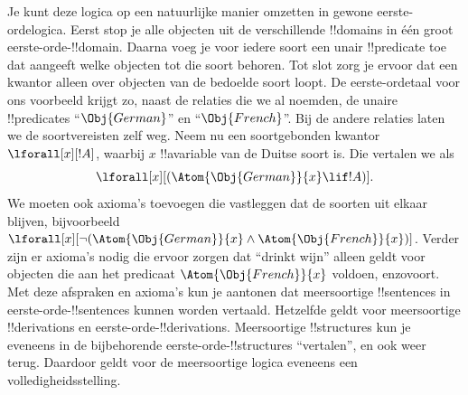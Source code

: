 \documentclass[openany]{memoir}
\begin{document}
Je kunt deze logica op een natuurlijke manier omzetten in gewone
eerste-ordelogica. Eerst stop je alle objecten uit de verschillende
!!{domain}s in één groot eerste-orde-!!{domain}. Daarna voeg je voor
iedere soort een unair !!{predicate} toe dat aangeeft welke objecten
tot die soort behoren. Tot slot zorg je ervoor dat een kwantor alleen
over objecten van de bedoelde soort loopt. De eerste-ordetaal voor ons
voorbeeld krijgt zo, naast de relaties die we al noemden, de unaire
!!{predicate}s ``$\Obj{German}$'' en ``$\Obj{French}$''. Bij de andere
relaties laten we de soortvereisten zelf weg. Neem nu een
soortgebonden kwantor $\lforall[x][!A]$, waarbij $x$ !!a{variable} van de
Duitse soort is. Die vertalen we als
\[
\lforall[x][(\Atom{\Obj{German}}{x} \lif !A)].
\]
We moeten ook axioma's toevoegen die vastleggen dat de soorten uit
elkaar blijven, bijvoorbeeld
$\lforall[x][\lnot (\Atom{\Obj{German}}{x} \land
  \Atom{\Obj{French}}{x})]$. Verder zijn er axioma's nodig die ervoor
zorgen dat ``drinkt wijn'' alleen geldt voor objecten die aan het
predicaat $\Atom{\Obj{French}}{x}$ voldoen, enzovoort. Met deze afspraken
en axioma's kun je aantonen dat meersoortige !!{sentence}s in
eerste-orde-!!{sentence}s kunnen worden vertaald. Hetzelfde geldt voor
meersoortige !!{derivation}s en eerste-orde-!!{derivation}s.
Meersoortige !!{structure}s kun je eveneens in de bijbehorende
eerste-orde-!!{structure}s ``vertalen'', en ook weer terug. Daardoor
geldt voor de meersoortige logica eveneens een volledigheidsstelling.
\endgroup

\begingroup
\def\olfilename{OLP-0177}
\def\olfilepath{content/first-order-logic/beyond/}
\hypertarget{unit-OLP-0177}{}




\end{document}
